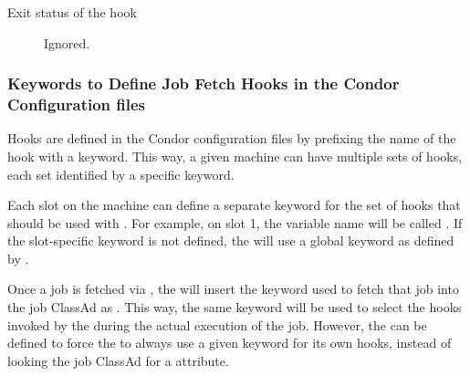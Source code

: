 \begin{itemize}
\begin{description}
\item[Exit status of the hook]
  Ignored.
\end{description}


% 

\end{itemize}

\subsubsection{\label{sec:job-hooks-keywords}
Keywords to Define Job Fetch Hooks in the Condor Configuration files }

Hooks are defined in the Condor configuration files by prefixing
the name of the hook with a keyword.
This way, a given machine can have multiple sets of hooks, each set
identified by a specific keyword.

Each slot on the machine can define a separate keyword for the set
of hooks that should be used with .
For example, on slot 1, the variable name will be
called .
If the slot-specific keyword is not defined, the  will
use a global keyword as defined by .

Once a job is fetched via , the
 will insert the keyword used to fetch that job into
the job ClassAd as .
This way, the same keyword will be used to select the hooks invoked by
the  during the actual execution of the job.
However, the  can be defined to
force the  to always use a given keyword for its own
hooks, instead of looking the job ClassAd for a 
attribute.

